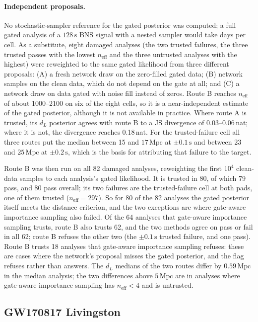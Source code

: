 \documentclass{openjournal}
\newcommand{\dL}{d_L}
\newcommand{\neff}{n_{\mathrm{eff}}}
\begin{document}
\paragraph{Independent proposals.}
No stochastic-sampler reference for the gated posterior was computed; a full gated analysis of a $128\,\mathrm{s}$ BNS signal with a nested sampler would take days per cell.
As a substitute, eight damaged analyses (the two trusted failures, the three trusted passes with the lowest $\neff$ and the three untrusted analyses with the highest) were reweighted to the same gated likelihood from three different proposals: (A) a fresh network draw on the zero-filled gated data; (B) network samples on the clean data, which do not depend on the gate at all; and (C) a network draw on data gated with noise fill instead of zeros.
Route B reaches $\neff$ of about 1000--2100 on six of the eight cells, so it is a near-independent estimate of the gated posterior, although it is not available in practice.
Where route A is trusted, its $\dL$ posterior agrees with route B to a JS divergence of 0.03--0.06\,nat; where it is not, the divergence reaches 0.18\,nat.
For the trusted-failure cell all three routes put the median between 15 and $17\,\mathrm{Mpc}$ at $\pm0.1\,\mathrm{s}$ and between 23 and $25\,\mathrm{Mpc}$ at $\pm0.2\,\mathrm{s}$, which is the basis for attributing that failure to the target.

Route B was then run on all 82 damaged analyses, reweighting the first $10^{4}$ clean-data samples to each analysis's gated likelihood.
It is trusted in 80, of which 79 pass, and 80 pass overall; its two failures are the trusted-failure cell at both pads, one of them trusted ($\neff=297$).
So for 80 of the 82 analyses the gated posterior itself meets the distance criterion, and the two exceptions are where gate-aware importance sampling also failed.
Of the 64 analyses that gate-aware importance sampling trusts, route B also trusts 62, and the two methods agree on pass or fail in all 62; route B refuses the other two (the $\pm0.1\,\mathrm{s}$ trusted failure, and one pass).
Route B trusts 18 analyses that gate-aware importance sampling refuses: these are cases where the network's proposal misses the gated posterior, and the flag refuses rather than answers.
The $\dL$ medians of the two routes differ by $0.59\,\mathrm{Mpc}$ in the median analysis; the two differences above $5\,\mathrm{Mpc}$ are in analyses where gate-aware importance sampling has $\neff<4$ and is untrusted.

\subsection{GW170817 Livingston}
\label{sec:gw170817}
\end{document}
